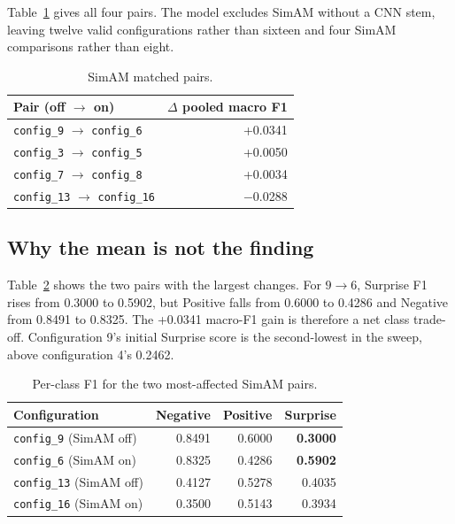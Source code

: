 Table~\ref{tab:simam-pairs-result} gives all four pairs. The model excludes SimAM without a CNN stem, leaving twelve valid configurations rather than sixteen and four SimAM comparisons rather than eight.

\begin{table}[htbp]
	\centering
	\begin{tabular}{l r}
		\hline
		\textbf{Pair (off $\rightarrow$ on)} & \textbf{$\Delta$ pooled macro F1} \\
		\hline
		\texttt{config\_9} $\rightarrow$ \texttt{config\_6}   & +0.0341 \\
		\texttt{config\_3} $\rightarrow$ \texttt{config\_5}   & +0.0050 \\
		\texttt{config\_7} $\rightarrow$ \texttt{config\_8}   & +0.0034 \\
		\texttt{config\_13} $\rightarrow$ \texttt{config\_16} & $-$0.0288 \\
		\hline
	\end{tabular}
	\caption[SimAM matched pairs]{SimAM matched pairs.}
	\label{tab:simam-pairs-result}
\end{table}

\subsection{Why the mean is not the finding}
\label{sec:simam-mean-not-finding}

Table~\ref{tab:simam-per-class} shows the two pairs with the largest changes. For $9\rightarrow6$, Surprise F1 rises from 0.3000 to 0.5902, but Positive falls from 0.6000 to 0.4286 and Negative from 0.8491 to 0.8325. The +0.0341 macro-F1 gain is therefore a net class trade-off. Configuration 9's initial Surprise score is the second-lowest in the sweep, above configuration 4's 0.2462.

\begin{table}[htbp]
	\centering
	\begin{tabular}{l r r r}
		\hline
		\textbf{Configuration} & \textbf{Negative} & \textbf{Positive} & \textbf{Surprise} \\
		\hline
		\texttt{config\_9} (SimAM off)  & 0.8491 & 0.6000 & \textbf{0.3000} \\
		\texttt{config\_6} (SimAM on)   & 0.8325 & 0.4286 & \textbf{0.5902} \\
		\texttt{config\_13} (SimAM off) & 0.4127 & 0.5278 & 0.4035 \\
		\texttt{config\_16} (SimAM on)  & 0.3500 & 0.5143 & 0.3934 \\
		\hline
	\end{tabular}
	\caption[Per-class F1 for the two most-affected SimAM pairs]{Per-class F1 for the two most-affected SimAM pairs.}
	\label{tab:simam-per-class}
\end{table}

